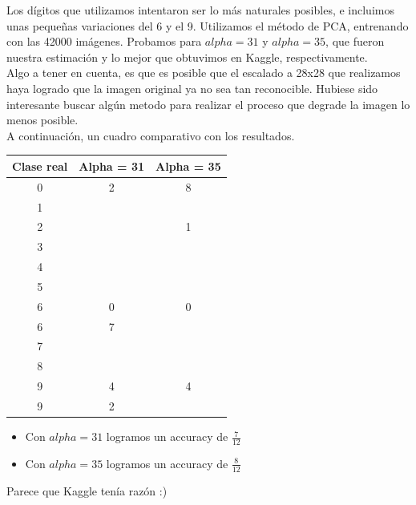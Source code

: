 Los dígitos que utilizamos intentaron ser lo más naturales posibles, e incluimos unas pequeñas variaciones del 6 y el 9. Utilizamos el método de PCA, entrenando con las 42000 imágenes. Probamos para $alpha=31$ y $alpha=35$, que fueron nuestra estimación y lo mejor que obtuvimos en Kaggle, respectivamente. \\

Algo a tener en cuenta, es que es posible que el escalado a 28x28 que realizamos haya logrado que la imagen original ya no sea tan reconocible. Hubiese sido interesante buscar algún metodo para realizar el proceso que degrade la imagen lo menos posible. \\

A continuación, un cuadro comparativo con los resultados. \\


\begin{center}
    \begin{tabular}{| c | c | c |}
    \hline
     Clase real    & Alpha = 31  & Alpha = 35 \\  \hline
     0 &     2  & 8 \\ \hline
     1 & \color{blue}{1} & \color{blue}{1} \\ \hline
     2 & \color{blue}{2} & 1 \\ \hline
     3 & \color{blue}{3} & \color{blue}{3} \\ \hline
     4 & \color{blue}{4} & \color{blue}{4} \\ \hline
     5 & \color{blue}{5} & \color{blue}{5} \\ \hline
     6 & 0 & 0 \\ \hline
     6 & 7 & \color{blue}{6} \\ \hline
     7 & \color{blue}{7} & \color{blue}{7} \\ \hline
     8 & \color{blue}{8} & \color{blue}{8} \\ \hline
     9 & 4 & 4 \\ \hline
     9 & 2 & \color{blue}{9} \\ \hline
    \end{tabular}
\end{center}

\begin{itemize}
\item Con $alpha=31$ logramos un accuracy de $\frac{7}{12}$
\item Con $alpha=35$ logramos un accuracy de $\frac{8}{12}$
\end{itemize}

Parece que Kaggle tenía razón :) \\